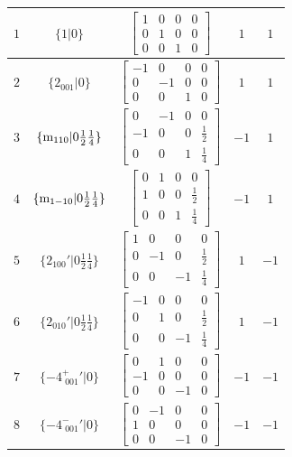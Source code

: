 \documentclass[fleqn,8pt]{jsarticle}
\begin{document}
\begin{longtable}{ccccc}
$ 1 $ & $ \{1|0\} $ & $ \begin{bmatrix} 1 & 0 & 0 & 0 \\ 0 & 1 & 0 & 0 \\ 0 & 0 & 1 & 0 \end{bmatrix} $ & $ 1 $ & $ 1 $ \\ \hline
$ 2 $ & $ \{2{}_{001}|0\} $ & $ \begin{bmatrix} -1 & 0 & 0 & 0 \\ 0 & -1 & 0 & 0 \\ 0 & 0 & 1 & 0 \end{bmatrix} $ & $ 1 $ & $ 1 $ \\ \hline
$ 3 $ & $ \{{\rm m}_{110}|0 \frac{1}{2} \frac{1}{4}\} $ & $ \begin{bmatrix} 0 & -1 & 0 & 0 \\ -1 & 0 & 0 & \frac{1}{2} \\ 0 & 0 & 1 & \frac{1}{4} \end{bmatrix} $ & $ -1 $ & $ 1 $ \\ \hline
$ 4 $ & $ \{{\rm m}_{1-10}|0 \frac{1}{2} \frac{1}{4}\} $ & $ \begin{bmatrix} 0 & 1 & 0 & 0 \\ 1 & 0 & 0 & \frac{1}{2} \\ 0 & 0 & 1 & \frac{1}{4} \end{bmatrix} $ & $ -1 $ & $ 1 $ \\ \hline
$ 5 $ & $ \{2{}_{100}{}'|0 \frac{1}{2} \frac{1}{4}\} $ & $ \begin{bmatrix} 1 & 0 & 0 & 0 \\ 0 & -1 & 0 & \frac{1}{2} \\ 0 & 0 & -1 & \frac{1}{4} \end{bmatrix} $ & $ 1 $ & $ -1 $ \\ \hline
$ 6 $ & $ \{2{}_{010}{}'|0 \frac{1}{2} \frac{1}{4}\} $ & $ \begin{bmatrix} -1 & 0 & 0 & 0 \\ 0 & 1 & 0 & \frac{1}{2} \\ 0 & 0 & -1 & \frac{1}{4} \end{bmatrix} $ & $ 1 $ & $ -1 $ \\ \hline
$ 7 $ & $ \{-4^{+}_{\,\,001}{}'|0\} $ & $ \begin{bmatrix} 0 & 1 & 0 & 0 \\ -1 & 0 & 0 & 0 \\ 0 & 0 & -1 & 0 \end{bmatrix} $ & $ -1 $ & $ -1 $ \\ \hline
$ 8 $ & $ \{-4^{-}_{\,\,001}{}'|0\} $ & $ \begin{bmatrix} 0 & -1 & 0 & 0 \\ 1 & 0 & 0 & 0 \\ 0 & 0 & -1 & 0 \end{bmatrix} $ & $ -1 $ & $ -1 $ \\ \hline

\end{longtable}
\end{document}

